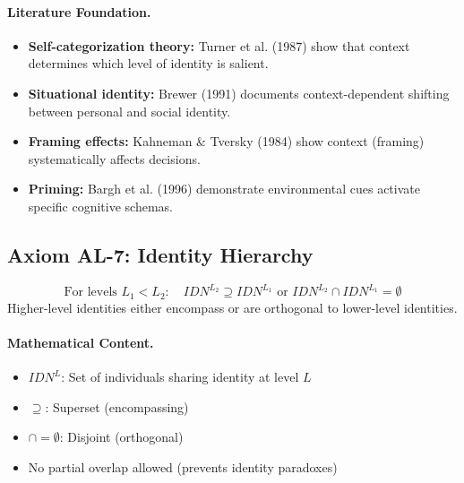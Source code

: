 \paragraph{Literature Foundation.}
\begin{itemize}
\item \textbf{Self-categorization theory:} Turner et al. (1987) show that context 
determines which level of identity is salient.
\item \textbf{Situational identity:} Brewer (1991) documents context-dependent 
shifting between personal and social identity.
\item \textbf{Framing effects:} Kahneman \& Tversky (1984) show context 
(framing) systematically affects decisions.
\item \textbf{Priming:} Bargh et al. (1996) demonstrate environmental cues 
activate specific cognitive schemas.
\end{itemize}

\subsection{Axiom AL-7: Identity Hierarchy}

\begin{tcolorbox}[colback=gray!5!white, colframe=gray!75!black, title=Axiom AL-7: Identity Hierarchy]
\begin{equation}
\boxed{
\text{For levels } L_1 < L_2: \quad IDN^{L_2} \supseteq IDN^{L_1} \text{ or } IDN^{L_2} \cap IDN^{L_1} = \emptyset
}
\end{equation}
Higher-level identities either encompass or are orthogonal to lower-level identities.
\end{tcolorbox}

\paragraph{Mathematical Content.}
\begin{itemize}
\item $IDN^L$: Set of individuals sharing identity at level $L$
\item $\supseteq$: Superset (encompassing)
\item $\cap = \emptyset$: Disjoint (orthogonal)
\item No partial overlap allowed (prevents identity paradoxes)
\end{itemize}

